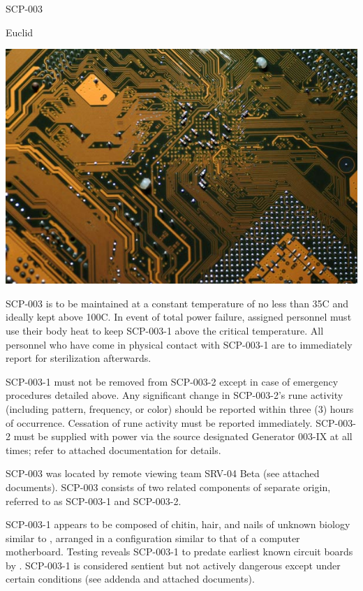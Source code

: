  SCP-003

 Euclid

\begin{center}
\includegraphics[scale=0.4]{scp/003.jpg}
\end{center}

 SCP-003 is to be maintained at a constant temperature of no less than 35\degree C and ideally kept above 100\degree C. In event of total power failure, assigned personnel must use their body heat to keep SCP-003-1 above the critical temperature. All personnel who have come in physical contact with SCP-003-1 are to immediately report for sterilization afterwards.

SCP-003-1 must not be removed from SCP-003-2 except in case of emergency procedures detailed above. Any significant change in SCP-003-2's rune activity (including pattern, frequency, or color) should be reported within three (3) hours of occurrence. Cessation of rune activity must be reported immediately. SCP-003-2 must be supplied with power via the source designated Generator 003-IX at all times; refer to attached documentation for details.

 SCP-003 was located by remote viewing team SRV-04 Beta (see attached documents). SCP-003 consists of two related components of separate origin, referred to as SCP-003-1 and SCP-003-2.

SCP-003-1 appears to be composed of chitin, hair, and nails of unknown biology similar to \redacted, arranged in a configuration similar to that of a computer motherboard. Testing reveals SCP-003-1 to predate earliest known circuit boards by \redacted. SCP-003-1 is considered sentient but not actively dangerous except under certain conditions (see addenda and attached documents).

